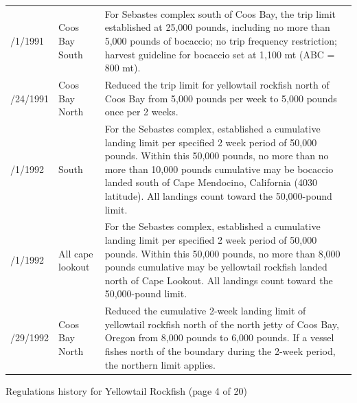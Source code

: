\documentclass[12pt,]{article}
\begin{document}
\begin{tabular}{>{\centering}p{.60in}>{\centering}p{1.0in}>{\raggedright}p{4.20in}}
  1/1/1991 & Coos Bay South & For Sebastes complex south of Coos Bay, the trip limit established at 25,000 pounds, including no more than 5,000 pounds of bocaccio; no trip frequency restriction; harvest guideline for bocaccio set at 1,100 mt (ABC = 800 mt). \\ 
  4/24/1991 & Coos Bay North & Reduced the trip limit for yellowtail rockfish north of Coos Bay from 5,000 pounds per week to 5,000 pounds once per 2 weeks. \\ 
  1/1/1992 & 4030 South & For the Sebastes complex, established a cumulative landing limit per specified 2 week period of 50,000 pounds.  Within this 50,000 pounds, no more than no more than 10,000 pounds cumulative may be bocaccio landed south of Cape Mendocino, California (4030  latitude).  All landings count toward the 50,000-pound limit. \\ 
  1/1/1992 & All cape lookout & For the Sebastes complex, established a cumulative landing limit per specified 2 week period of 50,000 pounds.  Within this 50,000 pounds, no more than 8,000 pounds cumulative may be yellowtail rockfish landed north of Cape Lookout.  All landings count toward the 50,000-pound limit. \\ 
  7/29/1992 & Coos Bay North & Reduced the cumulative 2-week landing limit of yellowtail rockfish north of the north jetty of Coos Bay, Oregon from 8,000 pounds to 6,000 pounds.  If a vessel fishes north of the boundary during the 2-week period, the northern limit applies. \\ 
   \hline
\end{tabular}

\endgroup
\newpage
Regulations history for Yellowtail Rockfish (page 4 of 20)
\begingroup\fontsize{9pt}{10pt}\selectfont
\end{document}
